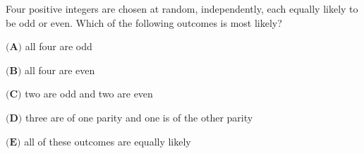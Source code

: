 Four positive integers are chosen at random, independently, each equally likely to be odd or even. Which of the following outcomes is most likely?

$\textbf{(A)}$ all four are odd

$\textbf{(B)}$ all four are even

$\textbf{(C)}$ two are odd and two are even

$\textbf{(D)}$ three are of one parity and one is of the other parity

$\textbf{(E)}$ all of these outcomes are equally likely
